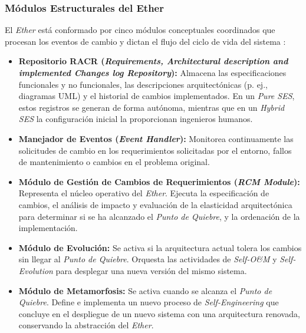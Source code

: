 \documentclass[12pt, letterpaper, oneside]{book}
\begin{document}
\subsubsection{Módulos Estructurales del Ether} 
El \textit{Ether} está conformado por cinco módulos conceptuales coordinados que procesan los eventos de cambio y dictan el flujo del ciclo de vida del sistema \cite{PerezCarrillo2026}: 
\begin{itemize} 
	\item \textbf{Repositorio RACR (\textit{Requirements, Architectural description and implemented Changes log Repository}):} Almacena las especificaciones funcionales y no funcionales, las descripciones arquitectónicas (p. ej., diagramas UML) y el historial de cambios implementados. En un \textit{Pure SES}, estos registros se generan de forma autónoma, mientras que en un \textit{Hybrid SES} la configuración inicial la proporcionan ingenieros humanos. 
	\item \textbf{Manejador de Eventos (\textit{Event Handler}):} Monitorea continuamente las solicitudes de cambio en los requerimientos solicitadas por el entorno, fallos de mantenimiento o cambios en el problema original. 
	\item \textbf{Módulo de Gestión de Cambios de Requerimientos (\textit{RCM Module}):} Representa el núcleo operativo del \textit{Ether}. Ejecuta la especificación de cambios, el análisis de impacto y evaluación de la elasticidad arquitectónica para determinar si se ha alcanzado el \textit{Punto de Quiebre}, y la ordenación de la implementación. 
	\item \textbf{Módulo de Evolución:} Se activa si la arquitectura actual tolera los cambios sin llegar al \textit{Punto de Quiebre}. Orquesta las actividades de \textit{Self-O\&M} y \textit{Self-Evolution} para desplegar una nueva versión del mismo sistema. 
	\item \textbf{Módulo de Metamorfosis:} Se activa cuando se alcanza el \textit{Punto de Quiebre}. Define e implementa un nuevo proceso de \textit{Self-Engineering} que concluye en el despliegue de un nuevo sistema con una arquitectura renovada, conservando la abstracción del \textit{Ether}. 
\end{itemize} 
\end{document}
